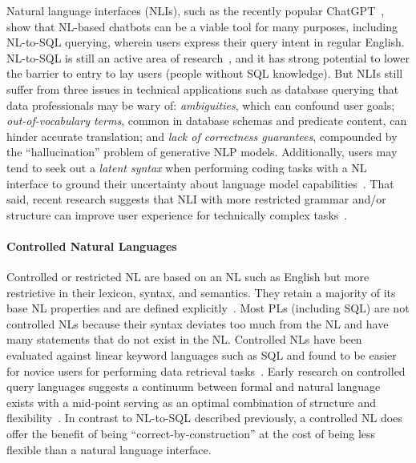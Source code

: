 Natural language interfaces (NLIs), such as the recently popular ChatGPT~\cite{radford2018improving, https://doi.org/10.48550/arxiv.2005.14165, openai-chatgpt-blog-post}, show that NL-based chatbots can be a viable tool for many purposes, including NL-to-SQL querying, wherein users express their query intent in regular English. NL-to-SQL is still an active area of research~\cite{Kim2020, https://doi.org/10.48550/arxiv.2005.14165, Scholak2021:PICARD, https://doi.org/10.48550/arxiv.2201.05966, 10.1145/3318464.3383128}, and it has strong potential to lower the barrier to entry to lay users (people without SQL knowledge).
But NLIs still suffer from three issues in technical applications such as database querying that data professionals may be wary of: \textit{ambiguities}, which can confound user goals; \textit{out-of-vocabulary terms}, common in database schemas and predicate content, can hinder accurate translation; and \textit{lack of correctness guarantees}, compounded by the ``hallucination'' problem of generative NLP models. Additionally, users may tend to seek out a \emph{latent syntax} when performing coding tasks with a NL interface to ground their uncertainty about language model capabilities~\cite{10.1145/3491102.3501870}.
That said, recent research suggests that NLI with more restricted grammar and/or structure can improve user experience for technically complex tasks~\cite{mu2019do}.

\paragraph{Controlled Natural Languages}

Controlled or restricted NL are based on an NL such as English but more restrictive in their lexicon, syntax, and semantics. 
They retain a majority of its base NL properties and are defined explicitly~\cite{10.1162/COLI_a_00168}. 
Most PLs (including SQL) are not controlled NLs because their syntax deviates too much from the NL and have many statements that do not exist in the NL. 
Controlled NLs have been evaluated against linear keyword languages such as SQL and found to be easier for novice users for performing data retrieval tasks~\cite{doi:10.1287/isre.3.3.252}. Early research on controlled query languages suggests a continuum between formal and natural language exists with a mid-point serving as an optimal combination of structure and flexibility~\cite{10.1145/800045.801602}.
In contrast to NL-to-SQL described previously, a controlled NL does offer the benefit of being ``correct-by-construction'' at the cost of being less flexible than a natural language interface.

